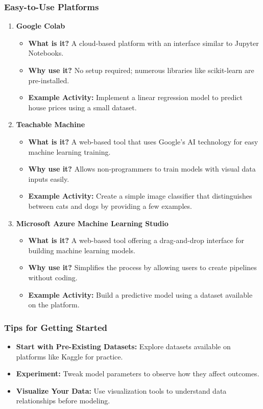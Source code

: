 \documentclass[aspectratio=169]{beamer}
\begin{document}
\begin{frame}[fragile]
    \frametitle{Easy-to-Use Platforms}
    \begin{enumerate}
        \item \textbf{Google Colab}
            \begin{itemize}
                \item \textbf{What is it?} A cloud-based platform with an interface similar to Jupyter Notebooks.
                \item \textbf{Why use it?} No setup required; numerous libraries like scikit-learn are pre-installed.
                \item \textbf{Example Activity:} Implement a linear regression model to predict house prices using a small dataset.
            \end{itemize}

        \item \textbf{Teachable Machine}
            \begin{itemize}
                \item \textbf{What is it?} A web-based tool that uses Google's AI technology for easy machine learning training.
                \item \textbf{Why use it?} Allows non-programmers to train models with visual data inputs easily.
                \item \textbf{Example Activity:} Create a simple image classifier that distinguishes between cats and dogs by providing a few examples.
            \end{itemize}
        
        \item \textbf{Microsoft Azure Machine Learning Studio}
            \begin{itemize}
                \item \textbf{What is it?} A web-based tool offering a drag-and-drop interface for building machine learning models.
                \item \textbf{Why use it?} Simplifies the process by allowing users to create pipelines without coding.
                \item \textbf{Example Activity:} Build a predictive model using a dataset available on the platform.
            \end{itemize}
    \end{enumerate}
\end{frame}

\begin{frame}[fragile]
    \frametitle{Tips for Getting Started}
    \begin{itemize}
        \item \textbf{Start with Pre-Existing Datasets:} Explore datasets available on platforms like Kaggle for practice.
        \item \textbf{Experiment:} Tweak model parameters to observe how they affect outcomes.
        \item \textbf{Visualize Your Data:} Use visualization tools to understand data relationships before modeling.
    \end{itemize}
\end{frame}
\end{document}
